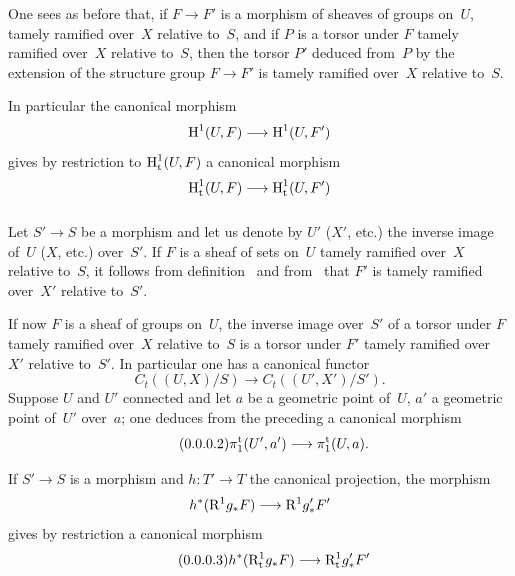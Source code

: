 One sees as before that, if $F\to F'$ is a morphism
of sheaves of groups on~$U$, tamely ramified over~$X$ relative to~$S$, and if $P$ is a torsor under $F$
tamely ramified over~$X$ relative
to~$S$, then the torsor $P'$ deduced from~$P$ by the extension of the
structure group $F\to F'$ is tamely ramified over~$X$
relative to~$S$.

In particular the canonical morphism
$$
\H^1(U,F)\to \H^1(U,F')
$$
gives by restriction to $\operatorname{H}^1_{\mathrm{t}}(U,F)$ a canonical morphism
$$
\H^1_{\tame}(U,F)\to\H^1_{\tame}(U,F')
$$

\subsubsection{}
\label{XIII.2.1.5}
Let $S'\to S$ be a morphism and let us denote by $U'$ (\resp $X'$, etc.)
the inverse image of~$U$ (\resp $X$, etc.) over~$S'$. If $F$ is a
sheaf of sets on~$U$ tamely ramified over~$X$
relative to~$S$, it follows from
definition~ and from~ that $F'$ is
tamely ramified over~$X'$ relative to~$S'$.

If now $F$ is a sheaf of groups on~$U$, the inverse image
over~$S'$ of a torsor under $F$ tamely ramified over~$X$
relative to~$S$ is a torsor under $F'$ tamely
ramified over~$X'$ relative to~$S'$. In particular one has a
canonical functor
\begin{equation*}
\label{eq:XIII.2.1.5.1}
\tag{\thesubsubsection.1} C_t((U,X)/S)\to C_t((U',X')/S').
\end{equation*}
Suppose $U$ and $U'$ connected and let $a$ be a
geometric point of~$U$, $a'$ a geometric point of~$U'$
over~$a$; one deduces from the preceding a canonical
morphism
\begin{equation*}
\label{eq:XIII.2.1.5.2}
\tag{\thesubsubsection.2} \pi_1^{\tame}(U',a')\to\pi_1^{\tame}(U,a).
\end{equation*}

If $S'\to S$ is a morphism and $h\colon T'\to T$ the canonical
projection, the morphism
$$
h^*(\R^1g_*F)\to\R^1g_*'F'
$$
gives by restriction a canonical morphism
\begin{equation*}
\label{eq:XIII.2.1.5.3}
\tag{\thesubsubsection.3} h^*(\R^1_{\tame}g_*F)\to\R^1_{\tame}g_*'F'
\end{equation*}

